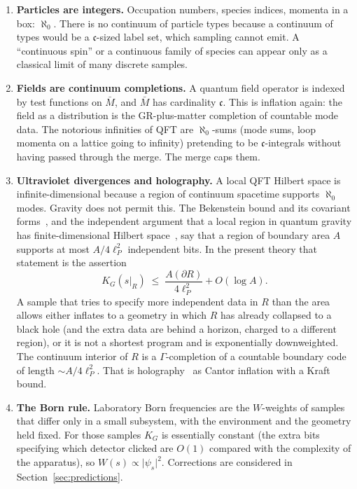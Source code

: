 \documentclass[11pt,a4paper]{article}
\theoremstyle{plain}
\theoremstyle{definition}
\theoremstyle{remark}
\newcommand{\alef}{\aleph_{0}}
\newcommand{\cont}{\mathfrak{c}}
\newcommand{\KG}{K_{G}}
\newcommand{\abs}[1]{\lvert#1\rvert}
\begin{document}
\begin{enumerate}
  \item \textbf{Particles are integers.}
  Occupation numbers, species indices, momenta in a box: $\alef$.
  There is no continuum of particle types because a continuum of types would be a $\cont$-sized label set, which sampling cannot emit.
  A ``continuous spin'' or a continuous family of species can appear only as a classical limit of many discrete samples.

  \item \textbf{Fields are continuum completions.}
  A quantum field operator is indexed by test functions on $\bar{M}$, and $\bar{M}$ has cardinality $\cont$.
  This is inflation again: the field as a distribution is the GR-plus-matter completion of countable mode data.
  The notorious infinities of QFT are $\alef$-sums (mode sums, loop momenta on a lattice going to infinity) pretending to be $\cont$-integrals without having passed through the merge.
  The merge caps them.

  \item \textbf{Ultraviolet divergences and holography.}
  A local QFT Hilbert space is infinite-dimensional because a region of continuum spacetime supports $\alef$ modes.
  Gravity does not permit this.
  The Bekenstein bound and its covariant forms~\cite{bekenstein1981,bousso1999}, and the independent argument that a local region in quantum gravity has finite-dimensional Hilbert space~\cite{bao2017}, say that a region of boundary area $A$ supports at most $A/4\ell_{P}^{2}$ independent bits.
  In the present theory that statement is the assertion
  \begin{equation}
    \KG(s|_{R}) \;\le\; \frac{A(\partial R)}{4\ell_{P}^{2}} + O(\log A).
    \label{eq:holo}
  \end{equation}
  A sample that tries to specify more independent data in $R$ than the area allows either inflates to a geometry in which $R$ has already collapsed to a black hole (and the extra data are behind a horizon, charged to a different region), or it is not a shortest program and is exponentially downweighted.
  The continuum interior of $R$ is a $\Gamma$-completion of a countable boundary code of length $\sim A/4\ell_{P}^{2}$.
  That is holography~\cite{tHooft1993,susskind1995,maldacena1998} as Cantor inflation with a Kraft bound.

  \item \textbf{The Born rule.}
  Laboratory Born frequencies are the $W$-weights of samples that differ only in a small subsystem, with the environment and the geometry held fixed.
  For those samples $\KG$ is essentially constant (the extra bits specifying which detector clicked are $O(1)$ compared with the complexity of the apparatus), so $W(s)\propto\abs{\psi_{s}}^{2}$.
  Corrections are considered in Section~\ref{sec:predictions}.


\end{enumerate}
\end{document}
